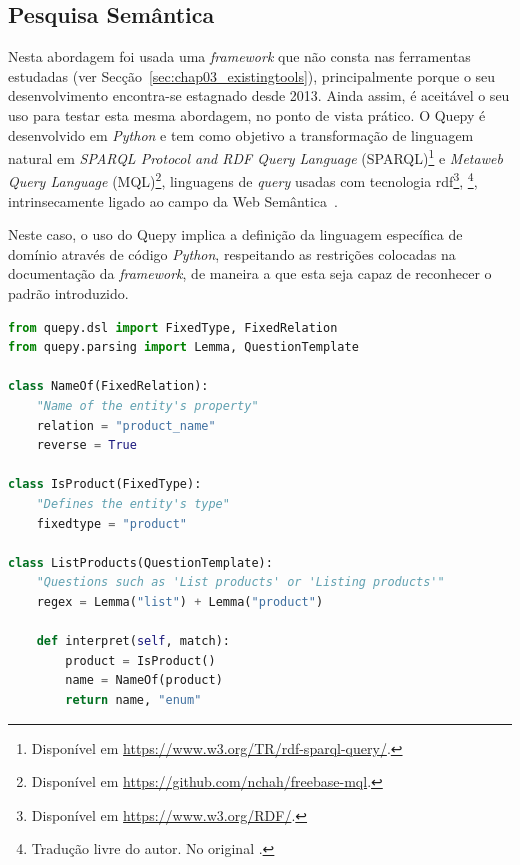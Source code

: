 \subsection{Pesquisa Semântica}
Nesta abordagem foi usada uma \textit{framework} que não consta nas ferramentas estudadas (ver Secção~\ref{sec:chap03_existingtools}), principalmente porque o seu desenvolvimento encontra-se estagnado desde 2013. Ainda assim, é aceitável o seu uso para testar esta mesma abordagem, no ponto de vista prático. O Quepy é desenvolvido em \textit{Python} e tem como objetivo a transformação de linguagem natural em \textit{SPARQL Protocol and RDF Query Language} (SPARQL)\footnote{Disponível em \url{https://www.w3.org/TR/rdf-sparql-query/}.} e \textit{Metaweb Query Language} (MQL)\footnote{Disponível em \url{https://github.com/nchah/freebase-mql}.}, linguagens de \textit{query} usadas com tecnologia \gls{rdf}\footnote{Disponível em \url{https://www.w3.org/RDF/}.}, \footnote{Tradução livre do autor. No original .}, intrinsecamente ligado ao campo da Web Semântica~\parencite{resource_description_framework}.

Neste caso, o uso do Quepy implica a definição da linguagem específica de domínio através de código \textit{Python}, respeitando as restrições colocadas na documentação da \textit{framework}, de maneira a que esta seja capaz de reconhecer o padrão introduzido.

\begin{lstlisting}[language=python, caption={Excerto da definição semântica da frase que lida com listagem de produtos},numbers=none,label=lst:quepyexample,basicstyle=\scriptsize]
from quepy.dsl import FixedType, FixedRelation
from quepy.parsing import Lemma, QuestionTemplate

class NameOf(FixedRelation):
    "Name of the entity's property"
    relation = "product_name"
    reverse = True

class IsProduct(FixedType):
    "Defines the entity's type"
    fixedtype = "product"

class ListProducts(QuestionTemplate):
    "Questions such as 'List products' or 'Listing products'"
    regex = Lemma("list") + Lemma("product")

    def interpret(self, match):
        product = IsProduct()
        name = NameOf(product)
        return name, "enum"

\end{lstlisting}

